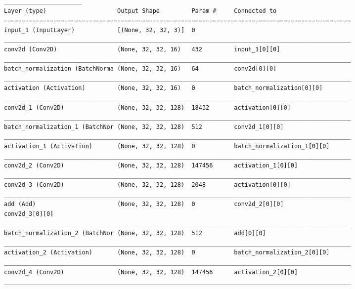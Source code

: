 \documentclass[12pt]{article}
\begin{document}
\begin{adjustwidth}{-50pt}{0pt}
\begin{Verbatim}
______________________
Layer (type)                    Output Shape         Param #     Connected to
==================================================================================================
input_1 (InputLayer)            [(None, 32, 32, 3)]  0
__________________________________________________________________________________________________
conv2d (Conv2D)                 (None, 32, 32, 16)   432         input_1[0][0]
__________________________________________________________________________________________________
batch_normalization (BatchNorma (None, 32, 32, 16)   64          conv2d[0][0]
__________________________________________________________________________________________________
activation (Activation)         (None, 32, 32, 16)   0           batch_normalization[0][0]
__________________________________________________________________________________________________
conv2d_1 (Conv2D)               (None, 32, 32, 128)  18432       activation[0][0]
__________________________________________________________________________________________________
batch_normalization_1 (BatchNor (None, 32, 32, 128)  512         conv2d_1[0][0]
__________________________________________________________________________________________________
activation_1 (Activation)       (None, 32, 32, 128)  0           batch_normalization_1[0][0]
__________________________________________________________________________________________________
conv2d_2 (Conv2D)               (None, 32, 32, 128)  147456      activation_1[0][0]
__________________________________________________________________________________________________
conv2d_3 (Conv2D)               (None, 32, 32, 128)  2048        activation[0][0]
__________________________________________________________________________________________________
add (Add)                       (None, 32, 32, 128)  0           conv2d_2[0][0]
conv2d_3[0][0]
__________________________________________________________________________________________________
batch_normalization_2 (BatchNor (None, 32, 32, 128)  512         add[0][0]
__________________________________________________________________________________________________
activation_2 (Activation)       (None, 32, 32, 128)  0           batch_normalization_2[0][0]
__________________________________________________________________________________________________
conv2d_4 (Conv2D)               (None, 32, 32, 128)  147456      activation_2[0][0]
__________________________________________________________________________________________________

\end{Verbatim}
\end{adjustwidth}
\end{document}

